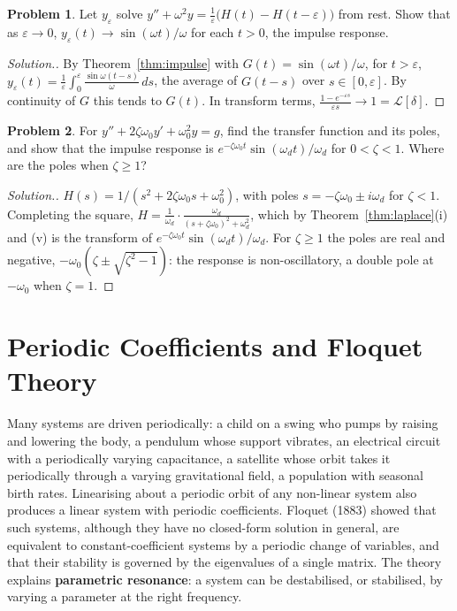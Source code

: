 \documentclass[11pt,a4paper]{article}
\numberwithin{equation}{section}
\theoremstyle{definition}
\newtheorem{problemx}{Problem}[subsection]
\newenvironment{problem}{\begin{problemx}}{\end{problemx}}
\newenvironment{solution}
  {\renewcommand{\qedsymbol}{}\begin{proof}[\textit{Solution}.]}
  {\end{proof}}
\begin{document}
\begin{problem}
\label{prob:deltalimit}
Let $y_\varepsilon$ solve $y'' + \omega^2y = \frac1\varepsilon\bigl(H(t) - H(t - \varepsilon)\bigr)$ from rest. Show that as $\varepsilon \to 0$, $y_\varepsilon(t) \to \sin(\omega t)/\omega$ for each $t > 0$, the impulse response.
\end{problem}

\begin{solution}
By Theorem~\ref{thm:impulse} with $G(t) = \sin(\omega t)/\omega$, for $t > \varepsilon$, $y_\varepsilon(t) = \frac1\varepsilon\int_0^\varepsilon\frac{\sin\omega(t - s)}{\omega}\,ds$, the average of $G(t - s)$ over $s \in [0, \varepsilon]$. By continuity of $G$ this tends to $G(t)$.
In transform terms, $\frac{1 - e^{-\varepsilon s}}{\varepsilon s} \to 1 = \mathcal L[\delta]$.
\end{solution}

\begin{problem}
For $y'' + 2\zeta\omega_0y' + \omega_0^2y = g$, find the transfer function and its poles, and show that the impulse response is $e^{-\zeta\omega_0t}\sin(\omega_dt)/\omega_d$ for $0 < \zeta < 1$. Where are the poles when $\zeta \geq 1$?
\end{problem}

\begin{solution}
$H(s) = 1/(s^2 + 2\zeta\omega_0s + \omega_0^2)$, with poles $s = -\zeta\omega_0 \pm i\omega_d$ for $\zeta < 1$. Completing the square, $H = \frac{1}{\omega_d}\cdot\frac{\omega_d}{(s + \zeta\omega_0)^2 + \omega_d^2}$, which by Theorem~\ref{thm:laplace}(i) and (v) is the
transform of $e^{-\zeta\omega_0t}\sin(\omega_dt)/\omega_d$. For $\zeta \geq 1$ the poles are real and negative, $-\omega_0(\zeta \pm \sqrt{\zeta^2 - 1})$: the response is non-oscillatory, a double pole at $-\omega_0$ when $\zeta = 1$.
\end{solution}

\section{Periodic Coefficients and Floquet Theory}
\label{sec:floquet}

Many systems are driven periodically: a child on a swing who pumps by raising and lowering the body, a pendulum whose support vibrates, an electrical
circuit with a periodically varying capacitance, a satellite whose orbit takes it periodically through a varying gravitational field, a population
with seasonal birth rates. Linearising about a periodic orbit of any non-linear system also produces a linear system with periodic coefficients. Floquet
(1883) showed that such systems, although they have no closed-form solution in general, are equivalent to constant-coefficient systems by a periodic
change of variables, and that their stability is governed by the eigenvalues of a single matrix. The theory explains \textbf{parametric resonance}: a system
can be destabilised, or stabilised, by varying a parameter at the right frequency.
\end{document}

